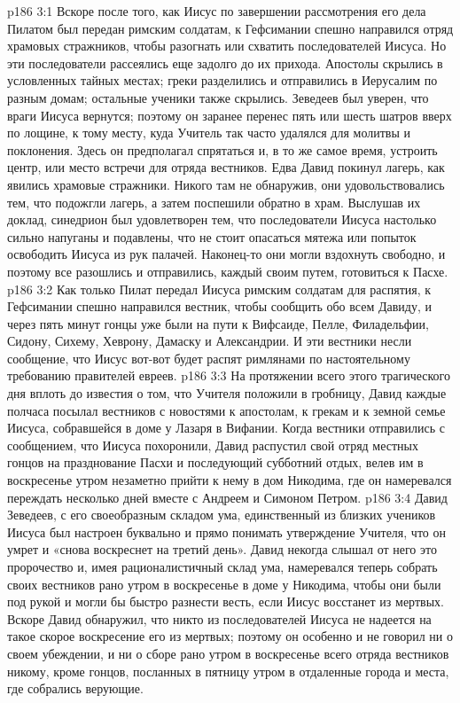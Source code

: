 \vs p186 3:1 Вскоре после того, как Иисус по завершении рассмотрения его дела Пилатом был передан римским солдатам, к Гефсимании спешно направился отряд храмовых стражников, чтобы разогнать или схватить последователей Иисуса. Но эти последователи рассеялись еще задолго до их прихода. Апостолы скрылись в условленных тайных местах; греки разделились и отправились в Иерусалим по разным домам; остальные ученики также скрылись. Зеведеев был уверен, что враги Иисуса вернутся; поэтому он заранее перенес пять или шесть шатров вверх по лощине, к тому месту, куда Учитель так часто удалялся для молитвы и поклонения. Здесь он предполагал спрятаться и, в то же самое время, устроить центр, или место встречи для отряда вестников. Едва Давид покинул лагерь, как явились храмовые стражники. Никого там не обнаружив, они удовольствовались тем, что подожгли лагерь, а затем поспешили обратно в храм. Выслушав их доклад, синедрион был удовлетворен тем, что последователи Иисуса настолько сильно напуганы и подавлены, что не стоит опасаться мятежа или попыток освободить Иисуса из рук палачей. Наконец\hyp{}то они могли вздохнуть свободно, и поэтому все разошлись и отправились, каждый своим путем, готовиться к Пасхе.
\vs p186 3:2 Как только Пилат передал Иисуса римским солдатам для распятия, к Гефсимании спешно направился вестник, чтобы сообщить обо всем Давиду, и через пять минут гонцы уже были на пути к Вифсаиде, Пелле, Филадельфии, Сидону, Сихему, Хеврону, Дамаску и Александрии. И эти вестники несли сообщение, что Иисус вот\hyp{}вот будет распят римлянами по настоятельному требованию правителей евреев.
\vs p186 3:3 На протяжении всего этого трагического дня вплоть до известия о том, что Учителя положили в гробницу, Давид каждые полчаса посылал вестников с новостями к апостолам, к грекам и к земной семье Иисуса, собравшейся в доме у Лазаря в Вифании. Когда вестники отправились с сообщением, что Иисуса похоронили, Давид распустил свой отряд местных гонцов на празднование Пасхи и последующий субботний отдых, велев им в воскресенье утром незаметно прийти к нему в дом Никодима, где он намеревался переждать несколько дней вместе с Андреем и Симоном Петром.
\vs p186 3:4 Давид Зеведеев, с его своеобразным складом ума, единственный из близких учеников Иисуса был настроен буквально и прямо понимать утверждение Учителя, что он умрет и «снова воскреснет на третий день». Давид некогда слышал от него это пророчество и, имея рационалистичный склад ума, намеревался теперь собрать своих вестников рано утром в воскресенье в доме у Никодима, чтобы они были под рукой и могли бы быстро разнести весть, если Иисус восстанет из мертвых. Вскоре Давид обнаружил, что никто из последователей Иисуса не надеется на такое скорое воскресение его из мертвых; поэтому он особенно и не говорил ни о своем убеждении, и ни о сборе рано утром в воскресенье всего отряда вестников никому, кроме гонцов, посланных в пятницу утром в отдаленные города и места, где собрались верующие.
